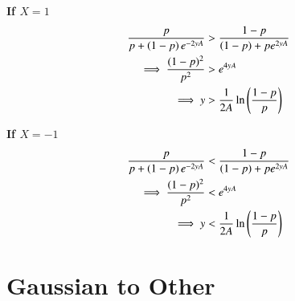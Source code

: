 \documentclass[journal,12pt,twocolumn]{IEEEtran}
\renewcommand\thesection{\arabic{section}}
\providecommand{\brak}[1]{\ensuremath{\left(#1\right)}}
\theoremstyle{remark}
\numberwithin{equation}{section}
\numberwithin{equation}{section}
\begin{document}
\begin{enumerate}[label=\thesection.\arabic*, ref=\thesection.\theenumi]
\textbf{If $X = 1$}
\begin{align}
        \frac{p}{p + \brak{1 - p}\e{-2yA}} &> \frac{1 - p}{\brak{1 - p} + pe^{2yA}} \nonumber \\
        \implies \frac{(1 - p)^2}{p^2} &> \e{4yA} \nonumber\\
        \implies y &> \frac{1}{2A}\ln{\brak{\frac{1 - p}{p}}} \label{threshold_1}
\end{align}

\textbf{If $X = -1$}
\begin{align}
        \frac{p}{p + \brak{1 - p}\e{-2yA}} &< \frac{1 - p}{\brak{1 - p} + pe^{2yA}} \nonumber \\
        \implies \frac{(1 - p)^2}{p^2} &< \e{4yA} \nonumber\\
        \implies y &< \frac{1}{2A}\ln{\brak{\frac{1 - p}{p}}} \label{threshold_1}
\end{align}

\end{enumerate}

        \newpage

\section{Gaussian to Other}
\end{document}
